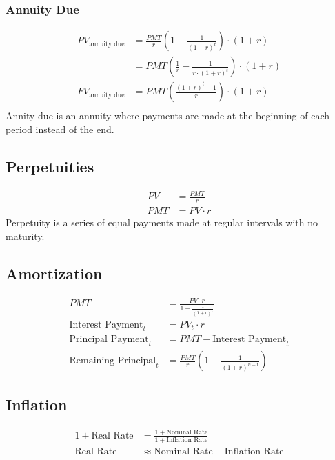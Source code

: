 \subsubsection{Annuity Due}
\begin{align*}
	PV_{\text{annuity due}} &= \frac{PMT}{r} \left(1 - \frac{1}{(1 + r)^t}\right) \cdot (1 + r) \\
	&= PMT \left(\frac{1}{r} - \frac{1}{r\cdot (1 + r)^t}\right) \cdot (1 + r) \\
	FV_{\text{annuity due}} &= PMT \left(\frac{(1 + r)^t - 1}{r}\right) \cdot (1 + r) \\
\end{align*}
Annity due is an annuity where payments are made at the beginning of each period instead of the end.
\subsection{Perpetuities}
\begin{align*}
	PV &= \frac{PMT}{r} \\
	PMT &= PV\cdot r
\end{align*}
Perpetuity is a series of equal payments made at regular intervals with no maturity.
\subsection{Amortization}
\begin{align*}
	PMT &= \frac{PV\cdot r}{1 - \frac{1}{(1 + r)^t}} \\
	\text{Interest Payment}_t &= PV_t\cdot r \\
	\text{Principal Payment}_t &= PMT - \text{Interest Payment}_t\\
	\text{Remaining Principal}_t &= \frac{PMT}{r} \left(1 - \frac{1}{(1 + r)^{n-t}}\right)
\end{align*}
\subsection{Inflation}
\begin{align*}
	1 + \text{Real Rate} &= \frac{1 + \text{Nominal Rate}}{1 + \text{Inflation Rate}} \\
	\text{Real Rate} &\approx \text{Nominal Rate} - \text{Inflation Rate}
\end{align*}
